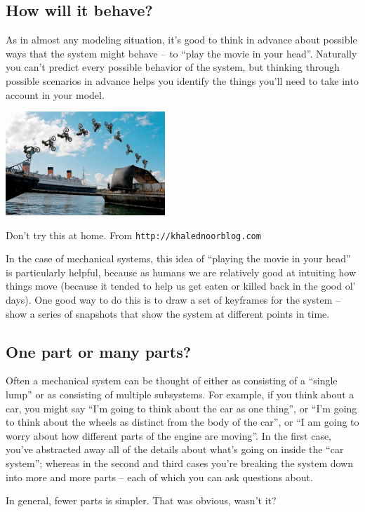 \subsection{How will it behave?}
As in almost any modeling situation, it's good to think in advance about possible ways that the system might behave -- to ``play the movie in your head''.  Naturally you can't predict every possible behavior of the system, but thinking through possible scenarios in advance helps you identify the things you'll need to take into account in your model.  
\begin{marginfigure}
\includegraphics[width=6cm]{figs/motorcyclekeyframe}
\caption{Don't try this at home.  From {\tt http://khalednoorblog.com}
 }
\end{marginfigure}
In the case of mechanical systems, this idea of ``playing the movie in your head'' is particularly helpful, because as humans we are relatively good at intuiting how things move (because it tended to help us get eaten or killed back in the good ol' days).  One good way to do this is to draw a set of keyframes for the system -- show a series of snapshots that show the system at different points in time.

\subsection{One part or many parts?}
Often a mechanical system can be thought of either as consisting of a ``single lump'' or as consisting of multiple subsystems.  For example, if you think about a car, you might say ``I'm going to think about the car as one thing'', or ``I'm going to think about the wheels as distinct from the body of the car'', or ``I am going to worry about how different parts of the engine are moving''.  In the first case, you've abstracted away all of the details about what's going on inside the ``car system''; whereas in the second and third cases you're breaking the system down into more and more parts -- each of which you can ask questions about.

In general, fewer parts is simpler.  That was obvious, wasn't it?

